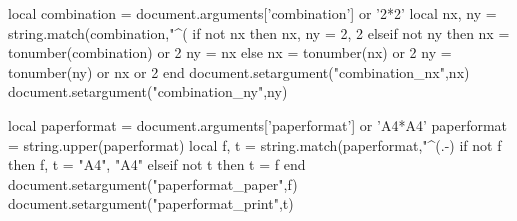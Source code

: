
\startluacode
    local combination = document.arguments['combination'] or '2*2'
    local nx, ny = string.match(combination,"^(%
    if not nx then
        nx, ny = 2, 2
    elseif not ny then
        nx = tonumber(combination) or 2
        ny = nx
    else
        nx = tonumber(nx) or 2
        ny = tonumber(ny) or nx or 2
    end
    document.setargument("combination_nx",nx)
    document.setargument("combination_ny",ny)
\stopluacode

\startluacode
    local paperformat = document.arguments['paperformat'] or 'A4*A4'
    paperformat = string.upper(paperformat)
    local f, t = string.match(paperformat,"^(.-)%
    if not f then
        f, t = "A4", "A4"
    elseif not t then
        t = f
    end
    document.setargument("paperformat_paper",f)
    document.setargument("paperformat_print",t)
\stopluacode

\endinput
